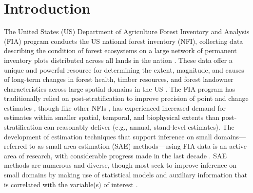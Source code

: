 \documentclass[11pt]{article}
\begin{document}
\section*{Introduction}


The United States (US) Department of Agriculture Forest Inventory and Analysis (FIA) program conducts the US national forest inventory (NFI), collecting data describing the condition of forest ecosystems on a large network of permanent inventory plots distributed across all lands in the nation \citep{smith2002forest}. These data offer a unique and powerful resource for determining the extent, magnitude, and causes of long-term changes in forest health, timber resources, and forest landowner characteristics across large spatial domains in the US \citep{wurtzebach2020supporting}. The FIA program has traditionally relied on post-stratification to improve precision of point and change estimates \citep{westfall2011post, bechtold2005enhanced}, though like other NFIs \citep{breidenbach2012small, kohl2006sampling}, has experienced increased demand for estimates within smaller spatial, temporal, and biophysical extents than post-stratification can reasonably deliver (e.g., annual, stand-level estimates). The development of estimation techniques that support inference on small domains---referred to as small area estimation (SAE) methods---using FIA data is an active area of research, with considerable progress made in the last decade \citep{hou2021updating, coulston2021enhancing, schroeder2014improving, lister2020use}. SAE methods are numerous and diverse, though most seek to improve inference on small domains by making use of statistical models and auxiliary information that is correlated with the variable(s) of interest \citep{rao2015small}.
\end{document}
